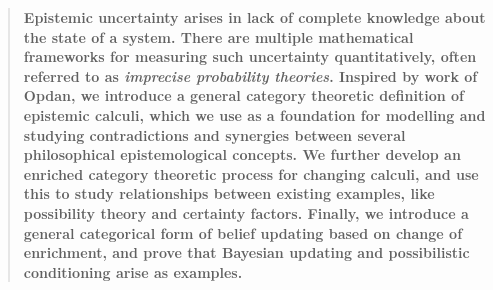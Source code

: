 
\begin{abstract}
    \textbf{Epistemic uncertainty arises in lack of complete knowledge about the state of a system. There are multiple mathematical frameworks for measuring such uncertainty quantitatively, often referred to as \emph{imprecise probability theories}. Inspired by work of Opdan, we introduce a general category theoretic definition of epistemic calculi, which we use as a foundation for modelling and studying contradictions and synergies between several philosophical epistemological concepts. We further develop an enriched category theoretic process for changing calculi, and use this to study relationships between existing examples, like possibility theory and certainty factors. Finally, we introduce a general categorical form of belief updating based on change of enrichment, and prove that Bayesian updating and possibilistic conditioning arise as examples.} 
\end{abstract}